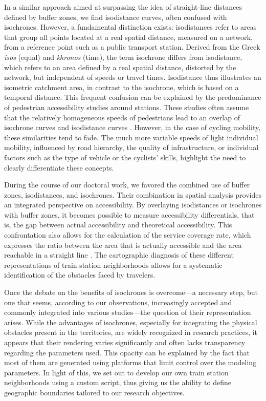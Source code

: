 \begin{refsegment}
In a similar approach aimed at surpassing the idea of straight-line distances defined by buffer zones, we find isodistance curves, often confused with isochrones. However, a fundamental distinction exists: isodistances refer to areas that group all points located at a real spatial distance, measured on a network, from a reference point such as a public transport station. Derived from the Greek \textsl{isos} (equal) and \textsl{khronos} (time), the term isochrone differs from isodistance, which refers to an area defined by a real spatial distance, distorted by the network, but independent of speeds or travel times. Isodistance thus illustrates an isometric catchment area, in contrast to the isochrone, which is based on a temporal distance. This frequent confusion can be explained by the predominance of pedestrian accessibility studies around stations. These studies often assume that the relatively homogeneous speeds of pedestrians lead to an overlap of isochrone curves and isodistance curves \textcolor{blue}{\autocite[9]{heran_zones_2009}}. However, in the case of cycling mobility, these similarities tend to fade. The much more variable speeds of light individual mobility, influenced by road hierarchy, the quality of infrastructure, or individual factors such as the type of vehicle or the cyclists' skills, highlight the need to clearly differentiate these concepts.%

During the course of our doctoral work, we favored the combined use of buffer zones, isodistances, and isochrones. Their combination in spatial analysis provides an integrated perspective on accessibility. By overlaying isodistances or isochrones with buffer zones, it becomes possible to measure accessibility differentials, that is, the gap between actual accessibility and theoretical accessibility. This confrontation also allows for the calculation of the service coverage rate, which expresses the ratio between the area that is actually accessible and the area reachable in a straight line \textcolor{blue}{\autocite[13]{heran_zones_2009}}. The cartographic diagnosis of these different representations of train station neighborhoods allows for a systematic identification of the obstacles faced by travelers.%

Once the debate on the benefits of isochrones is overcome—a necessary step, but one that seems, according to our observations, increasingly accepted and commonly integrated into various studies—the question of their representation arises. While the advantages of isochrones, especially for integrating the physical obstacles present in the territories, are widely recognized in research practices, it appears that their rendering varies significantly and often lacks transparency regarding the parameters used. This opacity can be explained by the fact that most of them are generated using platforms that limit control over the modeling parameters. In light of this, we set out to develop our own train station neighborhoods using a custom script, thus giving us the ability to define geographic boundaries tailored to our research objectives.%


\end{refsegment}

